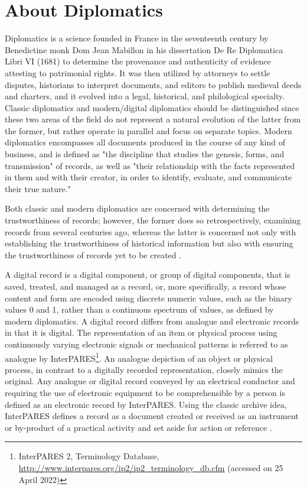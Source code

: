 \section{About Diplomatics}
Diplomatics is a science founded in France in the seventeenth century by Benedictine monk Dom Jean Mabillon in his dissertation De Re Diplomatica Libri VI (1681) to determine the provenance and authenticity of evidence attesting to patrimonial rights. It was then utilized by attorneys to settle disputes, historians to interpret documents, and editors to publish medieval deeds and charters, and it evolved into a legal, historical, and philological specialty.
Classic diplomatics and modern/digital diplomatics should be distinguished since these two areas of the field do not represent a natural evolution of the latter from the former, but rather operate in parallel and focus on separate topics. Modern diplomatics encompasses all documents produced in the course of any kind of business, and is defined as "the discipline that studies the genesis, forms, and transmission" of records, as well as "their relationship with the facts represented in them and with their creator, in order to identify, evaluate, and communicate their true nature."

Both classic and modern diplomatics are concerned with determining the trustworthiness of records; however, the former does so retrospectively, examining records from several centuries ago, whereas the latter is concerned not only with establishing the trustworthiness of historical information but also with ensuring the trustworthiness of records yet to be created \cite[10]{kirschenbaum2010digital}. 

A digital record is a digital component, or group of digital components, that is saved, treated, and managed as a record, or, more specifically, a record whose content and form are encoded using discrete numeric values, such as the binary values 0 and 1, rather than a continuous spectrum of values, as defined by modern diplomatics. A digital record differs from analogue and electronic records in that it is digital. The representation of an item or physical process using continuously varying electronic signals or mechanical patterns is referred to as analogue by InterPARES\footnote{InterPARES 2, Terminology Database, \url{http://www.interpares.org/ip2/ip2_terminology_db.cfm} (accessed on 25 April 2022)}.
An analogue depiction of an object or physical process, in contrast to a digitally recorded representation, closely mimics the original. Any analogue or digital record conveyed by an electrical conductor and requiring the use of electronic equipment to be comprehensible by a person is defined as an electronic record by InterPARES. Using the classic archive idea, InterPARES defines a record as a document created or received as an instrument or by-product of a practical activity and set aside for action or reference \cite[44]{duranti2009digital}.

